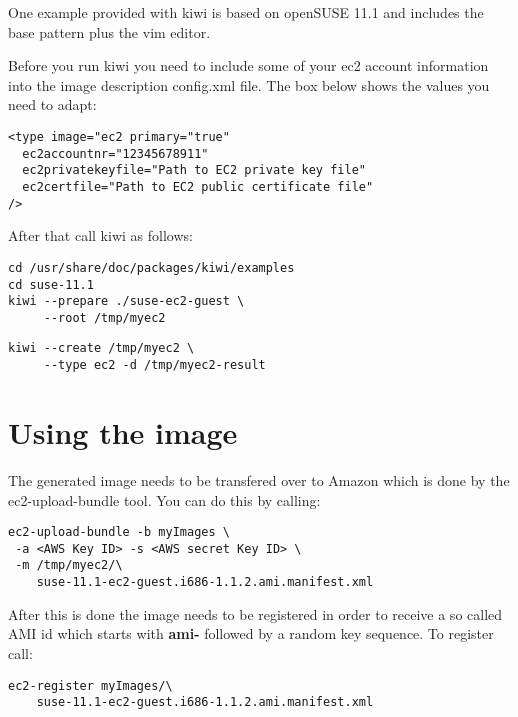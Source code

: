 One example provided with kiwi is based on openSUSE 11.1 and
includes the base pattern plus the vim editor.

Before you run kiwi you need to include some of your ec2 account
information into the image description config.xml file. The box
below shows the values you need to adapt:

\begin{Command}{13cm}
\begin{verbatim}
<type image="ec2 primary="true"
  ec2accountnr="12345678911"
  ec2privatekeyfile="Path to EC2 private key file"
  ec2certfile="Path to EC2 public certificate file"
/>
\end{verbatim}
\end{Command}

After that call kiwi as follows:

\begin{Command}{13cm}
\begin{verbatim}
cd /usr/share/doc/packages/kiwi/examples
cd suse-11.1
kiwi --prepare ./suse-ec2-guest \
     --root /tmp/myec2
\end{verbatim}
\end{Command}

\begin{Command}{13cm}
\begin{verbatim}
kiwi --create /tmp/myec2 \
     --type ec2 -d /tmp/myec2-result
\end{verbatim}
\end{Command}

\section{Using the image}
The generated image needs to be transfered over to Amazon which is
done by the ec2-upload-bundle tool. You can do this by calling:

\begin{Command}{13cm}
\begin{verbatim}
ec2-upload-bundle -b myImages \
 -a <AWS Key ID> -s <AWS secret Key ID> \
 -m /tmp/myec2/\
    suse-11.1-ec2-guest.i686-1.1.2.ami.manifest.xml
\end{verbatim}
\end{Command}

After this is done the image needs to be registered in order to
receive a so called AMI id which starts with \textbf{ami-} followed
by a random key sequence. To register call:

\begin{Command}{13cm}
\begin{verbatim}
ec2-register myImages/\
    suse-11.1-ec2-guest.i686-1.1.2.ami.manifest.xml
\end{verbatim}
\end{Command}

